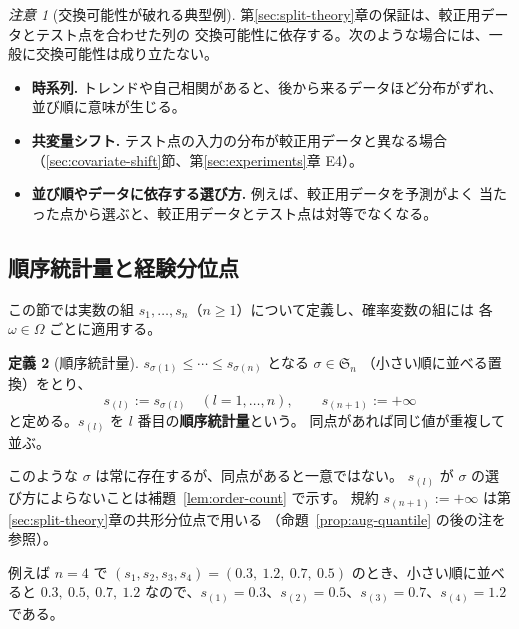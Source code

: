 \documentclass[a4paper,11pt]{jsarticle}
\theoremstyle{definition}
\newtheorem{definition}{定義}[section]
\theoremstyle{plain}
\theoremstyle{remark}
\newtheorem{remark}[definition]{注意}
\begin{document}
\begin{remark}[交換可能性が破れる典型例]
  \label{rem:exch-violation}
  第\ref{sec:split-theory}章の保証は、較正用データとテスト点を合わせた列の
  交換可能性に依存する。次のような場合には、一般に交換可能性は成り立たない。
  \begin{itemize}
    \item \textbf{時系列.} トレンドや自己相関があると、後から来るデータほど分布がずれ、
      並び順に意味が生じる。
    \item \textbf{共変量シフト.} テスト点の入力の分布が較正用データと異なる場合
      （\ref{sec:covariate-shift}節、第\ref{sec:experiments}章 E4）。
    \item \textbf{並び順やデータに依存する選び方.} 例えば、較正用データを予測がよく
      当たった点から選ぶと、較正用データとテスト点は対等でなくなる。
  \end{itemize}
\end{remark}

\subsection{順序統計量と経験分位点}
\label{sec:order-statistics}

この節では実数の組 $s_1,\dots,s_n$（$n\ge1$）について定義し、確率変数の組には
各 $\omega\in\Omega$ ごとに適用する。

\begin{definition}[順序統計量]
  \label{def:order-stat}
  $s_{\sigma(1)}\le\cdots\le s_{\sigma(n)}$ となる $\sigma\in\mathfrak{S}_n$
  （小さい順に並べる置換）をとり、
  \begin{equation*}
    s_{(l)}:=s_{\sigma(l)}\quad(l=1,\dots,n),\qquad s_{(n+1)}:=+\infty
  \end{equation*}
  と定める。$s_{(l)}$ を $l$ 番目の\textbf{順序統計量}という。
  同点があれば同じ値が重複して並ぶ。
\end{definition}

このような $\sigma$ は常に存在するが、同点があると一意ではない。
$s_{(l)}$ が $\sigma$ の選び方によらないことは補題~\ref{lem:order-count} で示す。
規約 $s_{(n+1)}:=+\infty$ は第\ref{sec:split-theory}章の共形分位点で用いる
（命題~\ref{prop:aug-quantile} の後の注を参照）。

例えば $n=4$ で $(s_1,s_2,s_3,s_4)=(0.3,\ 1.2,\ 0.7,\ 0.5)$ のとき、小さい順に並べると
$0.3,\ 0.5,\ 0.7,\ 1.2$ なので、$s_{(1)}=0.3$、$s_{(2)}=0.5$、$s_{(3)}=0.7$、$s_{(4)}=1.2$ である。
\end{document}
